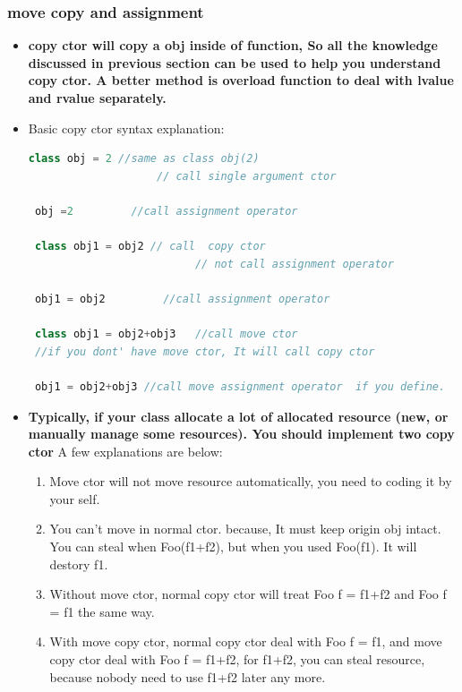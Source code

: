 \documentclass[a4paper,12pt,twoside]{book}
\begin{document}
\subsubsection{move copy and assignment }
\begin{itemize}
\item \textbf{copy ctor will copy a obj inside of function, So all the knowledge discussed in previous section can be used to help you understand copy ctor. A better method is overload function to deal with lvalue and rvalue separately. }

\item Basic copy ctor syntax explanation:
 \begin{lstlisting}[frame=single, language=c++]
 class obj = 2 //same as class obj(2)
                    // call single argument ctor

 obj =2         //call assignment operator

 class obj1 = obj2 // call  copy ctor
                          // not call assignment operator

 obj1 = obj2         //call assignment operator

 class obj1 = obj2+obj3   //call move ctor
 //if you dont' have move ctor, It will call copy ctor

 obj1 = obj2+obj3 //call move assignment operator  if you define.
\end{lstlisting}


\item \textbf{Typically, if your class allocate a lot of allocated resource (new, or manually manage some resources).  You should implement two copy ctor} A few explanations are below:

\begin{enumerate}
\item Move ctor will not move resource automatically, you need to coding it by your self.

\item You can't move in normal ctor. because, It must keep origin obj intact.  You can steal when Foo(f1+f2), but when you used Foo(f1).  It will destory f1.

\item Without  move ctor, normal copy ctor will treat Foo f = f1+f2 and Foo f = f1 the same way.

\item With move copy ctor, normal copy ctor deal with Foo f = f1, and move copy ctor deal with Foo f = f1+f2, for f1+f2, you can steal resource, because nobody need to use f1+f2 later any more.


\end{enumerate}
\end{itemize}
\end{document}
